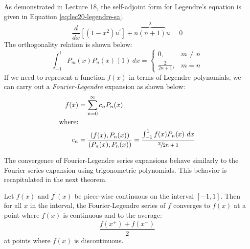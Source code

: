 As demonstrated in Lecture 18, the self-adjoint form for Legendre's equation is given in Equation \ref{eq:lec20-legendre-sa}.
\begin{equation}
\frac{d}{dx}\left[\left(1-x^2 \right) u^{\prime} \right] + \overbrace{n(n+1)}^{\lambda}u = 0
\label{eq:lec20-legendre-sa}
\end{equation}
The orthogonality relation is shown below:
\begin{equation*}
\int_{-1}^{1} P_m(x)P_n(x) (1) \ dx = 
\begin{cases}
0, & m\ne n \\
\frac{2}{2n+1}, & m=n
\end{cases}
\end{equation*}
If we need to represent a function $f(x)$ in terms of Legendre polynomials, we can carry out a \emph{Fourier-Legendre} expansion as shown below:
\begin{align}
f(x) &= \sum\limits_{n=0}^{\infty}c_n P_n(x) \label{eq:lec20-FL-exp}\\ 
\text{where:}& \nonumber \\
c_n &= \frac{\left(f(x),P_n(x) \right)}{\left(P_n(x),P_n(x) \right)} = \frac{\int_{-1}^{1} f(x) P_n(x) \ dx}{\sfrac{2}{2n+1}} 
\label{eq:lec20-FL-coeff}
\end{align}

The convergence of Fourier-Legendre series expansions behave similarly to the Fourier series expansion using trigonometric polynomials.  This behavior is recapitulated in the next theorem. 

\begin{theorem}
Let $f(x)$ and $f^{\prime}(x)$ be piece-wise continuous on the interval $[-1,1]$. Then for all $x$ in the interval, the Fourier-Legendre series of $f$ converges to $f(x)$ at a point where $f(x)$ is continuous and to the average:
\begin{equation*}
\frac{f(x^+) + f(x^-) }{2}
\end{equation*}
at points where $f(x)$ is discontinuous.
\end{theorem}

